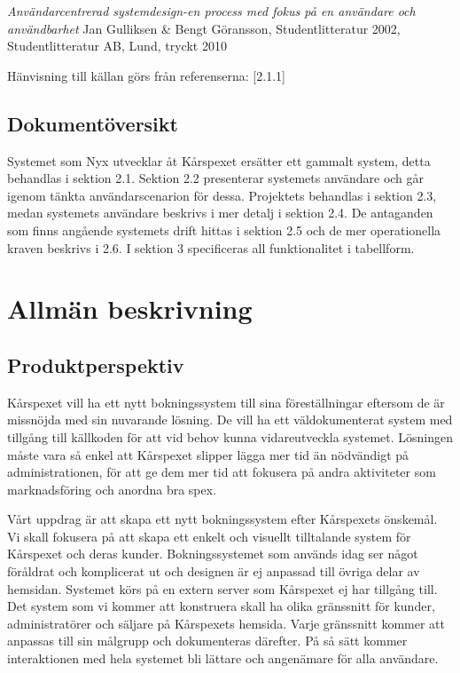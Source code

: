 \documentclass[a4paper, twoside, 11pt, titlepage]{article}
\begin{document}
		\emph{Användarcentrerad systemdesign-en process med fokus på en användare och användbarhet} Jan Gulliksen \& Bengt Göransson, Studentlitteratur 2002, Studentlitteratur AB, Lund, tryckt 2010

		Hänvisning till källan görs från referenserna: [2.1.1]

	\subsection{Dokumentöversikt}


	Systemet som Nyx utvecklar åt Kårspexet ersätter ett gammalt system, detta behandlas i sektion 2.1. Sektion 2.2 presenterar systemets användare och går igenom tänkta användarscenarion för dessa. Projektets behandlas i sektion 2.3, medan systemets användare beskrivs i mer detalj i sektion 2.4. De antaganden som finns angående systemets drift hittas i sektion 2.5 och de mer operationella kraven beskrivs i 2.6. I sektion 3 specificeras all funktionalitet i tabellform.

\clearpage
\section{Allmän beskrivning}



	\subsection{Produktperspektiv}


	Kårspexet vill ha ett nytt bokningssystem till sina föreställningar eftersom de är missnöjda med sin nuvarande lösning. De vill ha ett väldokumenterat system med tillgång till källkoden för att vid behov kunna vidareutveckla systemet. Lösningen måste vara så enkel att Kårspexet slipper lägga mer tid än nödvändigt på administrationen, för att ge dem mer tid att fokusera på andra aktiviteter som marknadsföring och anordna bra spex.

	Vårt uppdrag är att skapa ett nytt bokningssystem efter Kårspexets önskemål. Vi skall fokusera på att skapa ett enkelt och visuellt tilltalande system för Kårspexet och deras kunder. Bokningssystemet som används idag ser något föråldrat och komplicerat ut och designen är ej anpassad till övriga delar av hemsidan. Systemet körs på en extern server som Kårspexet ej har tillgång till. Det system som vi kommer att konstruera skall ha olika gränssnitt för kunder, administratörer och säljare på Kårspexets hemsida. Varje gränssnitt kommer att anpassas till sin målgrupp och dokumenteras därefter. På så sätt kommer interaktionen med hela systemet bli lättare och angenämare för alla användare.
\end{document}
